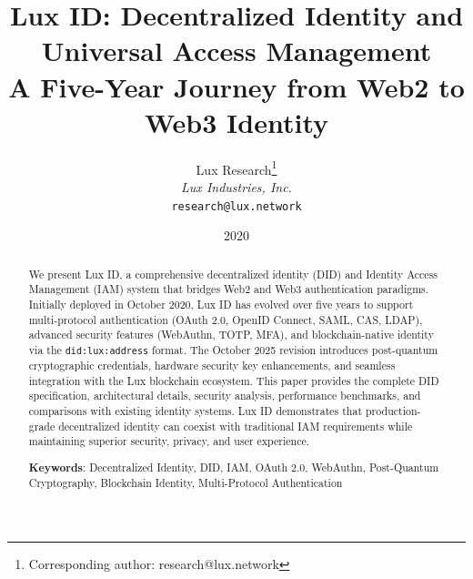 \documentclass[11pt,a4paper]{article}
\title{
  \textbf{Lux ID: Decentralized Identity and Universal Access Management} \\
  \large A Five-Year Journey from Web2 to Web3 Identity
}
\author{
Lux Research\thanks{Corresponding author: research@lux.network}\\
\textit{Lux Industries, Inc.}\\
\texttt{research@lux.network}
}
\date{2020}
\begin{document}
\luxcoverpage

\begin{abstract}
We present Lux ID, a comprehensive decentralized identity (DID) and Identity Access Management (IAM) system that bridges Web2 and Web3 authentication paradigms. Initially deployed in October 2020, Lux ID has evolved over five years to support multi-protocol authentication (OAuth 2.0, OpenID Connect, SAML, CAS, LDAP), advanced security features (WebAuthn, TOTP, MFA), and blockchain-native identity via the \texttt{did:lux:address} format. The October 2025 revision introduces post-quantum cryptographic credentials, hardware security key enhancements, and seamless integration with the Lux blockchain ecosystem. This paper provides the complete DID specification, architectural details, security analysis, performance benchmarks, and comparisons with existing identity systems. Lux ID demonstrates that production-grade decentralized identity can coexist with traditional IAM requirements while maintaining superior security, privacy, and user experience.

\textbf{Keywords}: Decentralized Identity, DID, IAM, OAuth 2.0, WebAuthn, Post-Quantum Cryptography, Blockchain Identity, Multi-Protocol Authentication
\end{abstract}

















\end{document}
